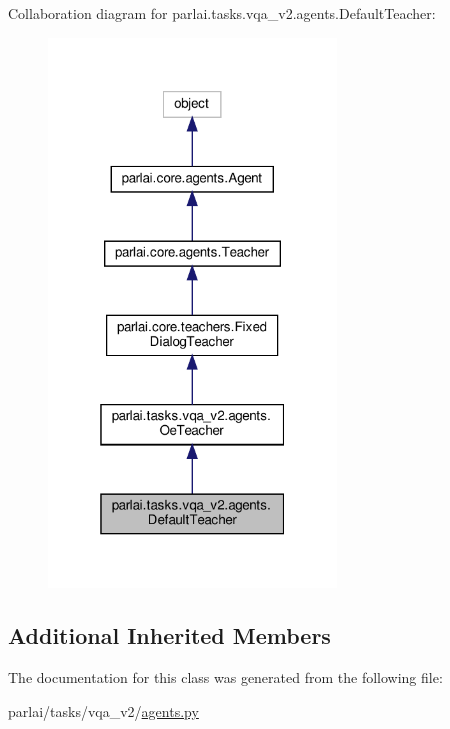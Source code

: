 Collaboration diagram for parlai.\+tasks.\+vqa\+\_\+v2.\+agents.\+Default\+Teacher\+:
\nopagebreak
\begin{figure}[H]
\begin{center}
\leavevmode
\includegraphics[width=217pt]{classparlai_1_1tasks_1_1vqa__v2_1_1agents_1_1DefaultTeacher__coll__graph}
\end{center}
\end{figure}
\subsection*{Additional Inherited Members}


The documentation for this class was generated from the following file\+:\begin{DoxyCompactItemize}
\item 
parlai/tasks/vqa\+\_\+v2/\hyperlink{parlai_2tasks_2vqa__v2_2agents_8py}{agents.\+py}\end{DoxyCompactItemize}
